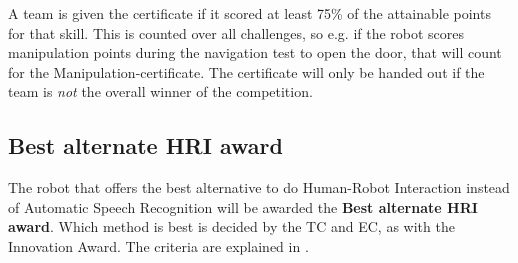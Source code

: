   A team is given the certificate if it scored at least 75\% of the attainable points for that skill.
  This is counted over all challenges, so e.g. if the robot scores manipulation points during the navigation test to open the door, that will count for the Manipulation-certificate.
  The certificate will only be handed out if the team is \emph{not} the overall winner of the competition. 

\subsection{Best alternate HRI award}
    \label{award:best_alternate_hri}
    The robot that offers the best alternative to do Human-Robot Interaction instead of Automatic Speech Recognition will be awarded the \textbf{Best alternate HRI award}.
    Which method is best is decided by the TC and EC, as with the Innovation Award. 
    The criteria are explained in .
